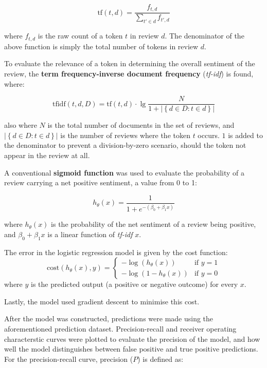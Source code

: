 \documentclass[12pt, bibliography=totocnumbered, paper=a4]{scrartcl}
\def\bf#1{\textbf{#1}}
\def\it#1{\textit{#1}}
\begin{document}
\begin{equation}
	\text{tf}(t,d) = \frac{f_{t,d}}{\sum_{t'\in d}^{}f_{t',d}}
	\label{eq:tf}
\end{equation}

where $f_{t,d}$ is the raw count of a token $t$ in review $d$. The denominator of the above
function is simply the total number of tokens in review $d$.

To evaluate the relevance of a token in determining the overall sentiment of the
review, the \bf{term frequency-inverse document frequency} (\it{tf-idf}) is found, where:

\begin{equation}
	\text{tfidf}(t,d,D) = \text{tf}(t,d)\cdot\lg\frac{N}{1+\left|\left\{d\in D : t\in d\right\}\right|}
	\label{eq:tfidf}
\end{equation}

also where $N$ is the total number of documents in the set of reviews, and
$\left|\left\{d\in D : t\in d\right\}\right|$ is the number of reviews where
the token $t$ occurs. $1$ is added to the denominator to prevent a
division-by-zero scenario, should the token not appear in the review at all.

A conventional \bf{sigmoid function} was used to evaluate the probability
of a review carrying a net positive sentiment, a value from 0 to 1:

\begin{equation}
	h_\theta(x) = \frac{1}{1+e^{-{\left(\beta_0+\beta_1x\right)}}}
	\label{eq:sigmoid}
\end{equation}

where $h_\theta(x)$ is the probability of the net sentiment of a review being positive, and
$\beta_0+\beta_1x$ is a linear function of \it{tf-idf} $x$.

The error in the logistic regression model is given by the cost function:
\begin{equation}
	\text{cost}\left(h_\theta\left(x\right),y\right) = \begin{cases}
		-\log\left(h_\theta\left(x\right)\right)   & \text{if } y = 1 \\
		-\log\left(1-h_\theta\left(x\right)\right) & \text{if } y = 0
	\end{cases}
\end{equation}
where $y$ is the predicted output (a positive or negative outcome) for every $x$.

Lastly, the model used gradient descent to minimise this cost.

After the model was constructed, predictions were made using the aforementioned
prediction dataset. Precision-recall and receiver operating characterstic curves
were plotted to evaluate the precision of the model,
and how well the model distinguishes between false positive and true positive predictions.
For the precision-recall curve, precision ($P$) is defined as:
\end{document}
